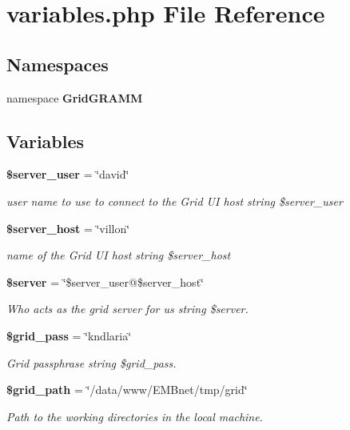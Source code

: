 \section{variables.php File Reference}
\label{variables_8php}
\subsection*{Namespaces}
\begin{CompactItemize}
\item 
namespace {\bf Grid\-GRAMM}
\end{CompactItemize}
\subsection*{Variables}
\begin{CompactItemize}
\item 
{\bf \$server\_\-user} = \char`\"{}david\char`\"{}
\begin{CompactList}\small\item\em user name to use to connect to the Grid UI host  string \$server\_\-user \item\end{CompactList}\item 
{\bf \$server\_\-host} = \char`\"{}villon\char`\"{}
\begin{CompactList}\small\item\em name of the Grid UI host  string \$server\_\-host \item\end{CompactList}\item 
{\bf \$server} = \char`\"{}\$server\_\-user@\$server\_\-host\char`\"{}
\begin{CompactList}\small\item\em Who acts as the grid server for us  string \$server. \item\end{CompactList}\item 
{\bf \$grid\_\-pass} = \char`\"{}kndlaria\char`\"{}
\begin{CompactList}\small\item\em Grid passphrase  string \$grid\_\-pass. \item\end{CompactList}\item 
{\bf \$grid\_\-path} = \char`\"{}/data/www/EMBnet/tmp/grid\char`\"{}
\begin{CompactList}\small\item\em Path to the working directories in the local machine. \item\end{CompactList}\end{CompactItemize}


